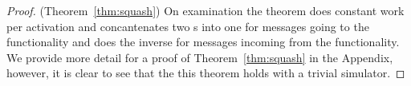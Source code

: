
\begin{proof} (Theorem~\ref{thm:squash})
On examination the  theorem does constant work per activation and concantenates two s into one for messages going to the functionality and does the inverse for messages incoming from the functionality.
We provide more detail for a proof of Theorem~\ref{thm:squash} in the Appendix, however, it is clear to see that the this theorem holds with a trivial simulator.
%
%
%
\end{proof}

